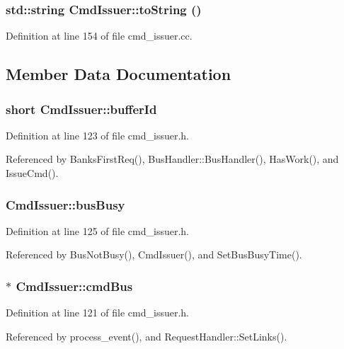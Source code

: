\subsubsection[{toString}]{\setlength{\rightskip}{0pt plus 5cm}std::string CmdIssuer::toString ()}\label{classCmdIssuer_0f974d7bee65d627f6247f2b970cf1d9}




Definition at line 154 of file cmd\_\-issuer.cc.

\subsection{Member Data Documentation}
\subsubsection[{bufferId}]{\setlength{\rightskip}{0pt plus 5cm}short {\bf CmdIssuer::bufferId}}\label{classCmdIssuer_5349d862a11425e1feeb656149341352}




Definition at line 123 of file cmd\_\-issuer.h.

Referenced by BanksFirstReq(), BusHandler::BusHandler(), HasWork(), and IssueCmd().
\subsubsection[{busBusy}]{ {\bf CmdIssuer::busBusy}}\label{classCmdIssuer_a39f3a34916eca57871a8d44820c50a8}




Definition at line 125 of file cmd\_\-issuer.h.

Referenced by BusNotBusy(), CmdIssuer(), and SetBusBusyTime().
\subsubsection[{cmdBus}]{$\ast$ {\bf CmdIssuer::cmdBus}}\label{classCmdIssuer_51c081738a59757304b5cb1955a4b016}




Definition at line 121 of file cmd\_\-issuer.h.

Referenced by process\_\-event(), and RequestHandler::SetLinks().
